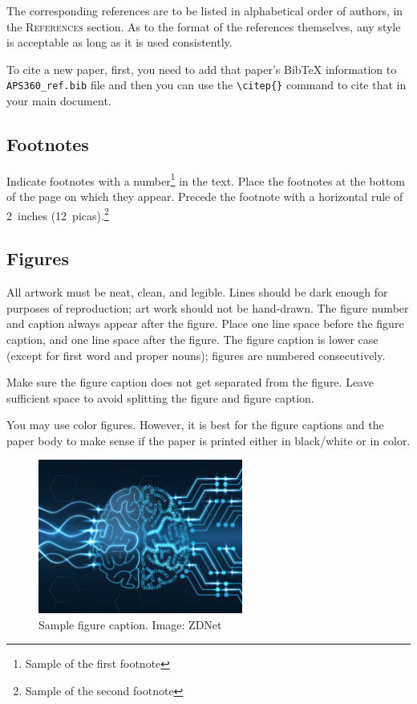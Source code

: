 \documentclass{article} %
\begin{document}
The corresponding references are to be listed in alphabetical order of
authors, in the \textsc{References} section. As to the format of the
references themselves, any style is acceptable as long as it is used
consistently.

To cite a new paper, first, you need to add that paper's BibTeX information to \verb+APS360_ref.bib+ file and then you can use the \verb|\citep{}| command to cite that in your main document. 

\subsection{Footnotes}

Indicate footnotes with a number\footnote{Sample of the first footnote} in the
text. Place the footnotes at the bottom of the page on which they appear.
Precede the footnote with a horizontal rule of 2~inches
(12~picas).\footnote{Sample of the second footnote}

\subsection{Figures}

All artwork must be neat, clean, and legible. Lines should be dark
enough for purposes of reproduction; art work should not be
hand-drawn. The figure number and caption always appear after the
figure. Place one line space before the figure caption, and one line
space after the figure. The figure caption is lower case (except for
first word and proper nouns); figures are numbered consecutively.

Make sure the figure caption does not get separated from the figure.
Leave sufficient space to avoid splitting the figure and figure caption.

You may use color figures.
However, it is best for the
figure captions and the paper body to make sense if the paper is printed
either in black/white or in color.

\begin{figure}[h]
\begin{center}
\includegraphics[width=0.6\textwidth]{Figs/td-deep-learning.jpg}
\end{center}
\caption{Sample figure caption. Image: ZDNet}
\end{figure}
\end{document}

